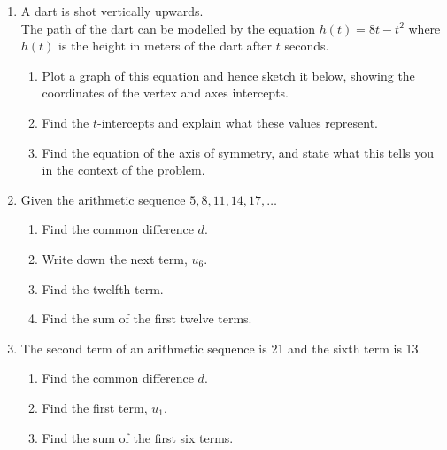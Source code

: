 \documentclass[12pt, twoside]{article}
\begin{document}
\begin{enumerate}
\newpage


\newpage
\item A dart is shot vertically upwards.\\[0.25cm]
The path of the dart can be modelled by the equation $h(t)=8t-t^2$ where $h(t)$ is the height in meters of the dart after $t$ seconds.
    \begin{enumerate}
        \item Plot a graph of this equation and hence sketch it below, showing the coordinates of the vertex and axes intercepts.
        \item Find the $t$-intercepts and explain what these values represent. \vspace{2cm}
        \item Find the equation of the axis of symmetry, and state what this tells you in the context of the problem. \vspace{2cm}
    \end{enumerate}
    \begin{center}
    \end{center}

\newpage
\item Given the arithmetic sequence $5,8,11,14,17, \dots$
    \begin{enumerate}[itemsep=0.8cm]
    \item Find the common difference $d$.
    \item Write down the next term, $u_6$.
    \item Find the twelfth term.\vspace{1cm}
    \item Find the sum of the first twelve terms.
    \end{enumerate} \vspace{2cm}

    \item The second term of an arithmetic sequence is 21 and the sixth term is 13.
    \begin{enumerate}[itemsep=2.5cm]
    \item Find the common difference $d$.
    \item Find the first term, $u_{1}$.
    \item Find the sum of the first six terms.
    \end{enumerate} \vspace{2cm}


\end{enumerate}
\end{document}
